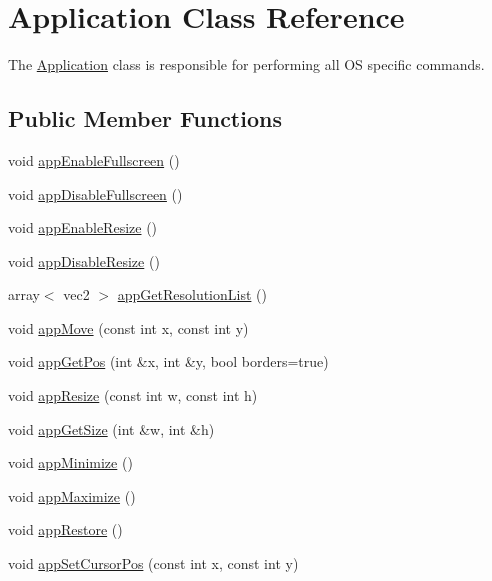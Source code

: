 \hypertarget{class_application}{\section{Application Class Reference}
\label{class_application}
}


The \hyperlink{class_application}{Application} class is responsible for performing all O\+S specific commands.  


\subsection*{Public Member Functions}
\begin{DoxyCompactItemize}
\item 
void \hyperlink{class_application_a058309652fa5b8a6bbacb6d19d765404}{app\+Enable\+Fullscreen} ()
\item 
void \hyperlink{class_application_a8f06182cfb4e7abec9608c2692bc93ad}{app\+Disable\+Fullscreen} ()
\item 
void \hyperlink{class_application_ab5b54c0a8e547ee0ab2bce9fbdb792a5}{app\+Enable\+Resize} ()
\item 
void \hyperlink{class_application_a242fc13b0ed9a143e4416d00d7de3199}{app\+Disable\+Resize} ()
\item 
array$<$ vec2 $>$ \hyperlink{class_application_a5b02c95e118a79ff29e4f9cc95e492c8}{app\+Get\+Resolution\+List} ()
\item 
void \hyperlink{class_application_ade77d59e07c39e8d053dec4e1fa6cf0a}{app\+Move} (const int x, const int y)
\item 
void \hyperlink{class_application_aa315981fa7c63165e6cad738de05acb3}{app\+Get\+Pos} (int \&x, int \&y, bool borders=true)
\item 
void \hyperlink{class_application_a3eae706a0f0ce5e5ccfc2d93a2c9483a}{app\+Resize} (const int w, const int h)
\item 
void \hyperlink{class_application_a361001d71f1cd930712aae29b30303ea}{app\+Get\+Size} (int \&w, int \&h)
\item 
void \hyperlink{class_application_abd1ddbf3839ed8f8a820f7bb21474106}{app\+Minimize} ()
\item 
void \hyperlink{class_application_a196583d4fcabd6b99cc7d717f11f2e06}{app\+Maximize} ()
\item 
void \hyperlink{class_application_aa69f401b598507a626d6ae31032c5b07}{app\+Restore} ()
\item 
void \hyperlink{class_application_a55bb1d96e5cff13b86ccd8a42edf7cdc}{app\+Set\+Cursor\+Pos} (const int x, const int y)

\end{DoxyCompactItemize}
